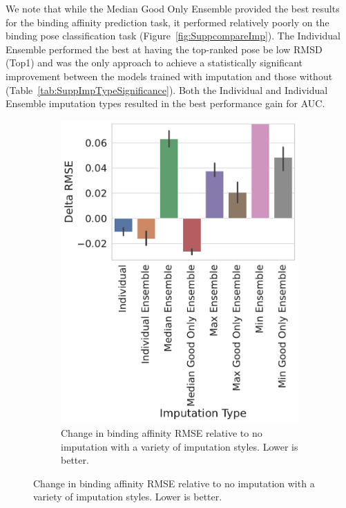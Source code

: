\documentclass[journal=jcim,manuscript=article]{achemso}
\begin{document}
We note that while the Median Good Only Ensemble provided the best results for the binding affinity prediction task, it performed relatively poorly on the binding pose classification task (Figure~\ref{fig:SuppcompareImp}).
The Individual Ensemble performed the best at having the top-ranked pose be low RMSD (Top1) and was the only approach to achieve a statistically significant improvement between the models trained with imputation and those without (Table~\ref{tab:SuppImpTypeSignificance}).
Both the Individual and Individual Ensemble imputation types resulted in the best performance gain for AUC.

\begin{figure}[tbph]
    \centering
    \begin{subfigure}[t]{0.48\textwidth}
        \centering
        \includegraphics[width=\linewidth]{figures/ComparingImpStylesRMSE.pdf}
        \caption{Change in binding affinity RMSE relative to no imputation with a variety of imputation styles. Lower is better.}
    \end{subfigure}

\end{figure}
\end{document}
